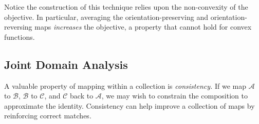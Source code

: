 Notice the construction of this technique relies upon the non-convexity of the \GWa objective.  In particular, averaging the orientation-preserving and orientation-reversing maps \emph{increases} the \GWa objective, a property that cannot hold for convex functions.

\subsection{Joint Domain Analysis}\label{sec:consistency}

A valuable property of mapping within a collection is \emph{consistency.} If we map $\mathcal A$ to $\mathcal B$, $\mathcal B$ to  $\mathcal C$, and  $\mathcal C$ back to  $\mathcal A$, we may wish to constrain the composition to approximate the identity.  Consistency can help improve a collection of maps by reinforcing correct matches.%


